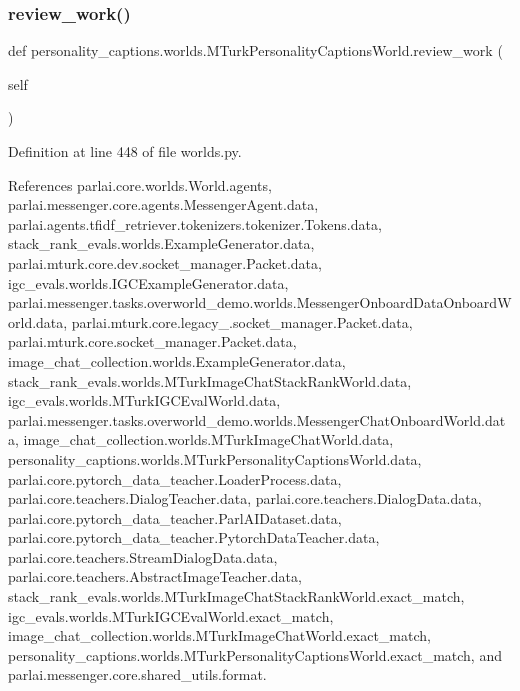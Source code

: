 \subsubsection{\texorpdfstring{review\+\_\+work()}{review\_work()}}
{\footnotesize\ttfamily def personality\+\_\+captions.\+worlds.\+M\+Turk\+Personality\+Captions\+World.\+review\+\_\+work (\begin{DoxyParamCaption}\item[{}]{self }\end{DoxyParamCaption})}



Definition at line 448 of file worlds.\+py.



References parlai.\+core.\+worlds.\+World.\+agents, parlai.\+messenger.\+core.\+agents.\+Messenger\+Agent.\+data, parlai.\+agents.\+tfidf\+\_\+retriever.\+tokenizers.\+tokenizer.\+Tokens.\+data, stack\+\_\+rank\+\_\+evals.\+worlds.\+Example\+Generator.\+data, parlai.\+mturk.\+core.\+dev.\+socket\+\_\+manager.\+Packet.\+data, igc\+\_\+evals.\+worlds.\+I\+G\+C\+Example\+Generator.\+data, parlai.\+messenger.\+tasks.\+overworld\+\_\+demo.\+worlds.\+Messenger\+Onboard\+Data\+Onboard\+World.\+data, parlai.\+mturk.\+core.\+legacy\+\_.\+socket\+\_\+manager.\+Packet.\+data, parlai.\+mturk.\+core.\+socket\+\_\+manager.\+Packet.\+data, image\+\_\+chat\+\_\+collection.\+worlds.\+Example\+Generator.\+data, stack\+\_\+rank\+\_\+evals.\+worlds.\+M\+Turk\+Image\+Chat\+Stack\+Rank\+World.\+data, igc\+\_\+evals.\+worlds.\+M\+Turk\+I\+G\+C\+Eval\+World.\+data, parlai.\+messenger.\+tasks.\+overworld\+\_\+demo.\+worlds.\+Messenger\+Chat\+Onboard\+World.\+data, image\+\_\+chat\+\_\+collection.\+worlds.\+M\+Turk\+Image\+Chat\+World.\+data, personality\+\_\+captions.\+worlds.\+M\+Turk\+Personality\+Captions\+World.\+data, parlai.\+core.\+pytorch\+\_\+data\+\_\+teacher.\+Loader\+Process.\+data, parlai.\+core.\+teachers.\+Dialog\+Teacher.\+data, parlai.\+core.\+teachers.\+Dialog\+Data.\+data, parlai.\+core.\+pytorch\+\_\+data\+\_\+teacher.\+Parl\+A\+I\+Dataset.\+data, parlai.\+core.\+pytorch\+\_\+data\+\_\+teacher.\+Pytorch\+Data\+Teacher.\+data, parlai.\+core.\+teachers.\+Stream\+Dialog\+Data.\+data, parlai.\+core.\+teachers.\+Abstract\+Image\+Teacher.\+data, stack\+\_\+rank\+\_\+evals.\+worlds.\+M\+Turk\+Image\+Chat\+Stack\+Rank\+World.\+exact\+\_\+match, igc\+\_\+evals.\+worlds.\+M\+Turk\+I\+G\+C\+Eval\+World.\+exact\+\_\+match, image\+\_\+chat\+\_\+collection.\+worlds.\+M\+Turk\+Image\+Chat\+World.\+exact\+\_\+match, personality\+\_\+captions.\+worlds.\+M\+Turk\+Personality\+Captions\+World.\+exact\+\_\+match, and parlai.\+messenger.\+core.\+shared\+\_\+utils.\+format.

